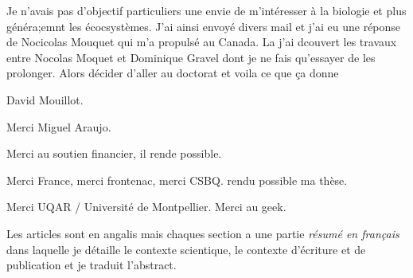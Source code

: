 
\avantpropos
{}
%

Je n'avais pas d'objectif particuliers une envie de m'intéresser à la biologie et plus généra;emnt les écocsystèmes. J'ai ainsi envoyé divers mail et j'ai eu une réponse de Nocicolas Mouquet qui m'a propulsé au Canada. La j'ai dcouvert les travaux entre Nocolas Moquet et Dominique Gravel dont je ne fais qu'essayer de les prolonger. Alors décider d'aller au doctorat et voila ce que ça donne

David Mouillot.

Merci Miguel Araujo.

Merci au soutien financier, il rende possible.

Merci France, merci frontenac, merci CSBQ. rendu possible ma thèse.

Merci UQAR / Université de Montpellier.
Merci au geek.


Les articles sont en angalis mais chaques section a une partie \textit{résumé en français} dans laquelle je détaille le contexte scientique, le contexte d'écriture et de publication et je traduit l'abstract.



%
%
%
%
%

